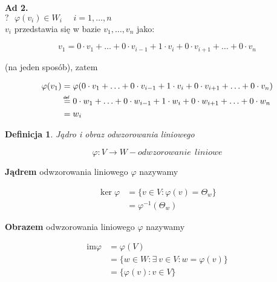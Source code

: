 \documentclass[a5paper,8pt]{article}
\newtheorem{definition}{Definicja}[section]
\newcommand\defeq[1]{\mathrel{\overset{\makebox[0pt]{\mbox{\normalfont\tiny\sffamily def~{#1}}}}{=}}}
\begin{document}
    \large{\textbf{Ad 2.}} \\
    $ ? ~~~ \varphi(v_i) \in W_i ~~~~~~ i = 1, \ldots, n $ \\
    $ v_i $ przedstawia się w bazie $ v_1, \ldots, v_n $ jako:

    \begin{equation*}
        v_1 = 0 \cdot v_1 + \ldots + 0 \cdot v_{i-1} + 1 \cdot v_i + 0 \cdot v_{i+1} + \ldots + 0 \cdot v_n
    \end{equation*}

    (na jeden sposób), zatem

    \begin{equation*}
        \begin{aligned}
            \varphi(v_1) & = \varphi(0 \cdot v_1 + \ldots + 0 \cdot v_{i-1} + 1 \cdot v_i + 0 \cdot v_{i+1} + \ldots + 0 \cdot v_n) \\
            & \defeq{} 0 \cdot w_1 + \ldots + 0 \cdot w_{i-1} + 1 \cdot w_i + 0 \cdot w_{i+1} + \ldots + 0 \cdot w_n \\
            & = w_i
        \end{aligned}
    \end{equation*}

    \begin{definition}
        Jądro i obraz odwzorowania liniowego
    \end{definition}

    \begin{equation*}
        \varphi : V \longrightarrow W - odwzorowanie~~liniowe
    \end{equation*}

    \textbf{Jądrem} odwzorowania liniowego $ \varphi $ nazywamy

    \begin{equation*}
        \begin{aligned}
            \ker \varphi & = \{ v \in V: \varphi(v) = \Theta_w \} \\
            & = \varphi^{-1}( \Theta_w )
        \end{aligned}
    \end{equation*}

    \textbf{Obrazem} odwzorowania liniowego $ \varphi $ nazywamy

    \begin{equation*}
        \begin{aligned}
            \text{im} \varphi & = \varphi(V) \\
            & = \{ w \in W: \exists~ v \in V: w = \varphi(v) \} \\
            & = \{ \varphi(v): v \in V \}
        \end{aligned}
    \end{equation*}
\end{document}
